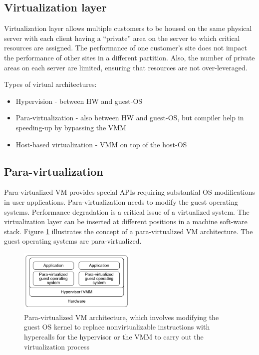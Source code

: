 \documentclass[12pt]{report}
\begin{document}
\subsection*{Virtualization layer}
Virtualization layer allows multiple customers to be housed on the same physical server with each client having a “private” area on the server to which critical resources are assigned. The performance of one customer’s site does not impact the performance of other sites in a different partition. Also, the number of private areas on each server are limited, ensuring that resources are not over-leveraged.

Types of virtual architectures:
\begin{itemize}
\item Hypervision - between HW and guest-OS
\item Para-virtualization - also between HW and guest-OS, but compiler help in speeding-up by bypassing the VMM
\item Host-based virtualization - VMM on top of the host-OS
\end{itemize}

\subsection*{Para-virtualization}
Para-virtualized VM provides special APIs requiring substantial OS modifications in user applications. Para-virtualization needs to modify the guest operating systems. Performance degradation is a critical issue of a virtualized system. The virtualization layer can be inserted at different positions in a machine soft-ware stack. Figure \ref{paravirt} illustrates the concept of a para-virtualized VM architecture. The guest operating systems are para-virtualized.

\begin{figure}[ht]
		\centering
           \includegraphics[width=0.5\textwidth]{paravirt.png}
         \caption{Para-virtualized VM architecture, which involves modifying the guest OS kernel to replace nonvirtualizable instructions with hypercalls for the hypervisor or the VMM to carry out the virtualization process}
         \label{paravirt}
\end{figure} 
\end{document}

